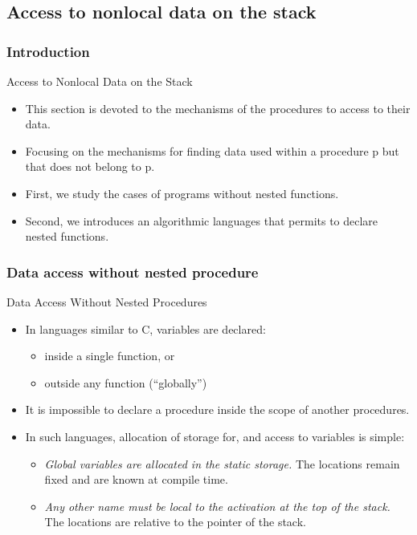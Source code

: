 \begin{bibunit}[apalike]
\subsection{Access to nonlocal data on the stack}

\subsubsection{Introduction}

\tableofcontentslide[sections={1-4},sectionstyle={show/shaded},subsectionstyle={show/shaded/hide},subsubsectionstyle={show/show/hide/hide}]

\begin{frame}{Access to Nonlocal Data on the Stack}
	\begin{itemize}
	\item This section is devoted to the mechanisms of the procedures to access to their data.
	\item Focusing on the mechanisms for finding data used within a procedure p but that does not belong to p.
	\vfill
	\item First, we study the cases of programs without nested functions.
	\item Second, we introduces an algorithmic languages that permits to declare nested functions.
	\end{itemize}
\end{frame}

\subsubsection{Data access without nested procedure}

\tableofcontentslide[sections={1-4},sectionstyle={show/shaded},subsectionstyle={show/shaded/hide},subsubsectionstyle={show/shaded/hide/hide}]

\begin{frame}{Data Access Without Nested Procedures}
	\begin{itemize}
	\item In languages similar to C, variables are declared:
		\begin{itemize}
		\item inside a single function, or
		\item outside any function (``globally'')
		\end{itemize}
	\vfill
	\item It is impossible to declare a procedure inside the scope of another procedures.
	\vfill
	\item In such languages, allocation of storage for, and access to variables is simple:
		\begin{itemize}
		\item \emph{Global variables are allocated in the static storage.} The locations remain fixed and are known at compile time.
		\item \emph{Any other name must be local to the activation at the top of the stack.} The locations are relative to the  pointer of the stack.
		\end{itemize}
	\end{itemize}
\end{frame}


\end{bibunit}
